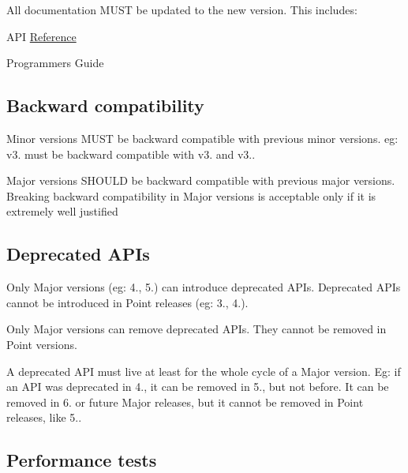 \begin{DoxyItemize}
\item All documentation M\+U\+ST be updated to the new version. This includes\+:
\begin{DoxyItemize}
\item A\+PI \hyperlink{structReference}{Reference}
\item Programmers Guide
\end{DoxyItemize}
\end{DoxyItemize}

\subsection*{Backward compatibility}


\begin{DoxyItemize}
\item Minor versions M\+U\+ST be backward compatible with previous minor versions. eg\+: v3. must be backward compatible with v3. and v3..
\item Major versions S\+H\+O\+U\+LD be backward compatible with previous major versions. Breaking backward compatibility in Major versions is acceptable only if it is extremely well justified
\end{DoxyItemize}

\subsection*{Deprecated A\+P\+Is}


\begin{DoxyItemize}
\item Only Major versions (eg\+: 4., 5.) can introduce deprecated A\+P\+Is. Deprecated A\+P\+Is cannot be introduced in Point releases (eg\+: 3., 4.).
\item Only Major versions can remove deprecated A\+P\+Is. They cannot be removed in Point versions.
\item A deprecated A\+PI must live at least for the whole cycle of a Major version. Eg\+: if an A\+PI was deprecated in 4., it can be removed in 5., but not before. It can be removed in 6. or future Major releases, but it cannot be removed in Point releases, like 5..
\end{DoxyItemize}

\subsection*{Performance tests}


